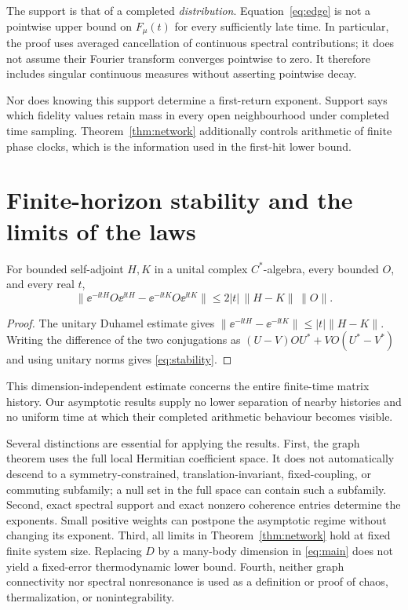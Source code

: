 The support is that of a completed \emph{distribution}.
Equation~\eqref{eq:edge} is not a pointwise upper bound on
$F_\mu(t)$ for every sufficiently late time. In particular, the
proof uses averaged cancellation of continuous spectral
contributions; it does not assume their Fourier transform
converges pointwise to zero. It therefore includes singular
continuous measures without asserting pointwise decay.

Nor does knowing this support determine a first-return exponent.
Support says which fidelity values retain mass in every open
neighbourhood under completed time sampling. Theorem~\ref{thm:network}
additionally controls arithmetic of finite phase clocks, which is
the information used in the first-hit lower bound.

\section{Finite-horizon stability and the limits of the laws}

\begin{proposition}\label{prop:stability}
For bounded self-adjoint $H,K$ in a unital complex $C^*$-algebra,
every bounded $O$, and every real $t$,
\begin{equation}
 \|\ee^{-\ii tH}O\ee^{\ii tH}
          -\ee^{-\ii tK}O\ee^{\ii tK}\|
       \leq2|t|\,\|H-K\|\,\|O\|.
 \label{eq:stability}
\end{equation}
\end{proposition}

\begin{proof}
The unitary Duhamel estimate gives
$\|\ee^{-\ii tH}-\ee^{-\ii tK}\|\leq|t|\|H-K\|$.
Writing the difference of the two conjugations as
$(U-V)OU^*+VO(U^*-V^*)$ and using unitary norms gives
\eqref{eq:stability}.
\end{proof}

This dimension-independent estimate concerns the entire finite-time
matrix history. Our asymptotic results supply no lower separation of
nearby histories and no uniform time at which their completed
arithmetic behaviour becomes visible.

Several distinctions are essential for applying the results.
First, the graph theorem uses the full local Hermitian coefficient
space. It does not automatically descend to a symmetry-constrained,
translation-invariant, fixed-coupling, or commuting subfamily; a null
set in the full space can contain such a subfamily. Second, exact
spectral support and exact nonzero coherence entries determine the
exponents. Small positive weights can postpone the asymptotic regime
without changing its exponent. Third, all limits in
Theorem~\ref{thm:network} hold at fixed finite system size. Replacing
$D$ by a many-body dimension in \eqref{eq:main} does not yield a
fixed-error thermodynamic lower bound. Fourth, neither graph
connectivity nor spectral nonresonance is used as a definition or
proof of chaos, thermalization, or nonintegrability.

